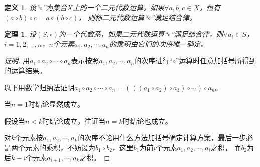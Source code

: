 \documentclass{article}
\newtheorem{Def}{定义}
\newtheorem{Thm}{定理}
\begin{document}
\begin{CJK*}{UTF8}{gbsn}
  \begin{Def}
    设“$\circ$”为集合$X$上的一个二元代数运算。如果$\forall a, b, c \in X$，恒有$(a \circ b) \circ c = a \circ (b \circ c)$， 则称二元代数运算“$\circ$”满足结合律。
  \end{Def}
\begin{Thm}
  设$(S,\circ)$为一个代数系，如果二元代数运算“$\circ$”满足结合律，则$\forall a_i\in S$，$i=1,2,\cdots,n$，$n$个元素$a_1,a_2,\cdots,a_n$的乘积由它们的次序唯一确定。
\end{Thm}
\begin{proof}[证明]
  用$a_1\circ a_2\circ \cdots \circ a_n$表示按照$a_1,a_2, \cdots, a_n$的次序进行“$\circ$”运算时任意加括号所得到的运算结果。

  以下用数学归纳法证明$a_1\circ a_2\circ \cdots \circ a_n=(((a_1\circ a_2)\circ a_3)\circ \cdots )\circ a_n$。

  当$n=1$时结论显然成立。

  假设当$n<k$时结论成立，往证当$n=k$时结论也成立。

  对$k$个元素按$a_1,a_2,\cdots,a_k$的次序不论用什么方法加括号确定计算方案，最后一步必是两个元素的乘积，不妨设为$b_1\circ b_2$，这里$b_1$为前$i$个元素$a_1,a_2,\cdots,a_i$之积，
  而$b_2$为后$k-i$个元素$a_{i+1},\cdots,a_k$之积。


\end{proof}
\end{CJK*}
\end{document}
